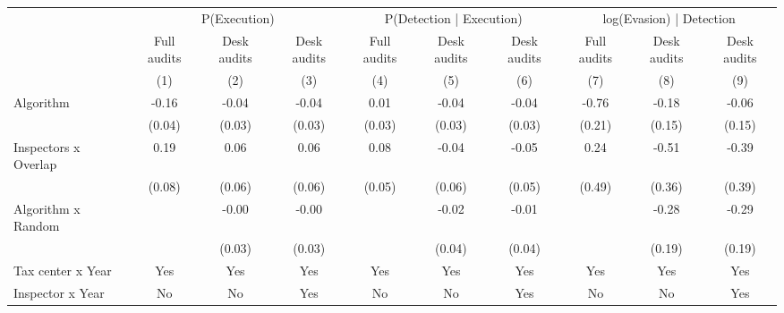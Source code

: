 \begin{tabular}{lccc|ccc|ccc} \toprule
\multicolumn{1}{l}{} & \multicolumn{3}{c}{P(Execution)} & \multicolumn{3}{c}{P(Detection | Execution)} & \multicolumn{3}{c}{log(Evasion) | Detection} \\\cmidrule(lr){2-4}\cmidrule(lr){5-7}\cmidrule(lr){8-10} \multicolumn{1}{l}{} & Full audits & Desk audits & Desk audits & Full audits & Desk audits & Desk audits & Full audits & Desk audits & Desk audits \\ \multicolumn{1}{l}{} & (1) & (2) & (3) & (4) & (5) & (6) & (7) & (8) & (9) \\ \midrule
Algorithm   &       -0.16\sym{***}&       -0.04         &       -0.04         &        0.01         &       -0.04         &       -0.04         &       -0.76\sym{***}&       -0.18         &       -0.06         \\
            &      (0.04)         &      (0.03)         &      (0.03)         &      (0.03)         &      (0.03)         &      (0.03)         &      (0.21)         &      (0.15)         &      (0.15)         \\
\addlinespace
Inspectors x Overlap&        0.19\sym{**} &        0.06         &        0.06         &        0.08         &       -0.04         &       -0.05         &        0.24         &       -0.51         &       -0.39         \\
            &      (0.08)         &      (0.06)         &      (0.06)         &      (0.05)         &      (0.06)         &      (0.05)         &      (0.49)         &      (0.36)         &      (0.39)         \\
\addlinespace
Algorithm x Random&                     &       -0.00         &       -0.00         &                     &       -0.02         &       -0.01         &                     &       -0.28         &       -0.29         \\
            &                     &      (0.03)         &      (0.03)         &                     &      (0.04)         &      (0.04)         &                     &      (0.19)         &      (0.19)         \\
\midrule
Tax center x Year&         Yes         &         Yes         &         Yes         &         Yes         &         Yes         &         Yes         &         Yes         &         Yes         &         Yes         \\
Inspector x Year&          No         &          No         &         Yes         &          No         &          No         &         Yes         &          No         &          No         &         Yes         \\

\end{tabular}
